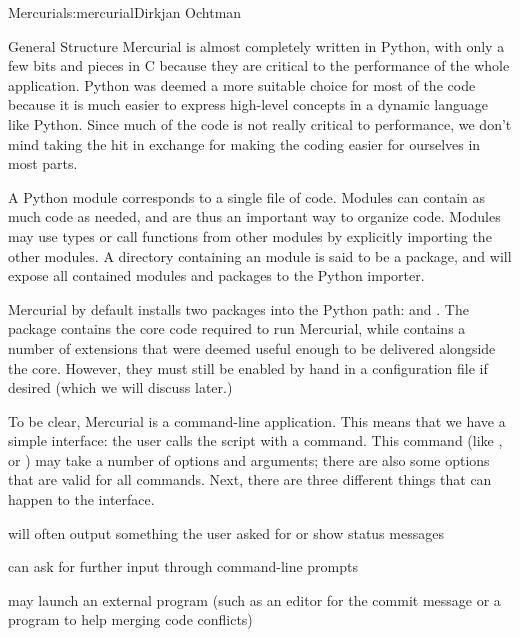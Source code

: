 \begin{aosachapter}{Mercurial}{s:mercurial}{Dirkjan Ochtman}
\begin{aosasect1}{General Structure}
Mercurial is almost completely written in Python, with only a few bits
and pieces in C because they are critical to the performance of the
whole application. Python was deemed a more suitable choice for most
of the code because it is much easier to express high-level concepts
in a dynamic language like Python. Since much of the code is not
really critical to performance, we don't mind taking the hit in
exchange for making the coding easier for ourselves in most parts.

A Python module corresponds to a single file of code. Modules can
contain as much code as needed, and are thus an important way to
organize code. Modules may use types or call functions from other
modules by explicitly importing the other modules. A directory
containing an  module is said to be a package,
and will expose all contained modules and packages to the Python
importer.

Mercurial by default installs two packages into the Python path:
 and . The  package
contains the core code required to run Mercurial, while 
contains a number of extensions that were deemed useful enough to be
delivered alongside the core. However, they must still be enabled by
hand in a configuration file if desired (which we will discuss later.)

To be clear, Mercurial is a command-line application. This means that
we have a simple interface: the user calls the  script with a
command. This command (like ,  or )
may take a number of options and arguments; there are also some
options that are valid for all commands. Next, there are three
different things that can happen to the interface.

\begin{aosaitemize}

  \item {} will often output something the user asked for or show
  status messages

  \item {} can ask for further input through command-line prompts

  \item {} may launch an external program (such as an editor for the
  commit message or a program to help merging code conflicts)

\end{aosaitemize}



\end{aosasect1}
\end{aosachapter}
